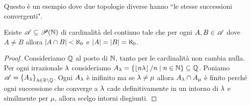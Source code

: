 \begin{remark}
Questo \`e un esempio dove due topologie diverse hanno ``le stesse successioni convergenti".
\end{remark}







\begin{fact}\label{FcQuasipartizioneDiNConInfinitiElementiMaFiniteIntersezioni}
Esiste $\mathscr{A}\subseteq \mathscr{P}(\mathbb{N})$ di cardinalit\`a del continuo tale che per ogni $A,B\in \mathscr{A}$ dove $A\neq B$ allora $\left|{A\cap B}\right|<\aleph_0$ e $\left|{A}\right|=\left|{B}\right|=\aleph_0$.
\end{fact}
\begin{proof}
Consideriamo $\mathbb{Q}$ al posto di $\mathbb{N}$, tanto per le cardinalit\`a non cambia nulla. Per ogni irrazionale $\lambda$ consideriamo $A_\lambda=\left\{{\left\lfloor {n\lambda}\right\rfloor/n\mid n\in\mathbb{N}}\right\}\subseteq \mathbb{Q}$. Poniamo $\mathscr{A}=\left\{{A_\lambda}\right\}_{\lambda\in\mathbb{R}\setminus\mathbb{Q}}$. Ogni $A_\lambda$ \`e inifinito ma se $\lambda\neq \mu$ allora $A_\lambda\cap A_\mu$ \`e finito perch\'e ogni successione che converge a $\lambda$ cade definitivamente in un intorno di $\lambda$ e similmente per $\mu$, allora scelgo intorni disgiunti.
\end{proof}



